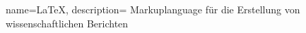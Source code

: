 {
    name=LaTeX,
    description= {Markuplanguage für die Erstellung von wissenschaftlichen Berichten}
}